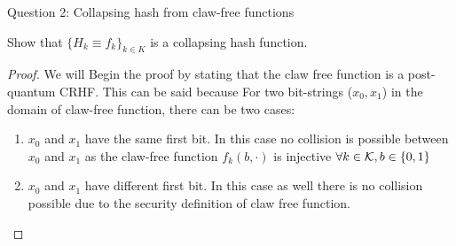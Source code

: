 \begin{solution}{Question 2: Collapsing hash from claw-free functions}\label{ques:x}
    \begin{question}
    Show that $\{H_k \equiv f_k\}_{k\in K}$ is a collapsing hash function.
    \end{question}
    \tcblower{}
    \begin{proof}
    We will Begin the proof by stating that the claw free function is a post-quantum CRHF. This can be said because For two bit-strings ($x_0,x_1$) in the domain of claw-free function, there can be two cases: \begin{enumerate}
        \item $x_0$ and $x_1$ have the same first bit. In this case no collision is possible between $x_0$ and $x_1$ as the claw-free function $f_k(b,\cdot)$ is injective $\forall k \in \mathcal{K}, b \in \{0,1\}$
        \item $x_0$ and $x_1$ have different first bit. In this case as well there is no collision possible due to the security definition of claw free function.
    \end{enumerate}

    
    \end{proof}
\end{solution}
